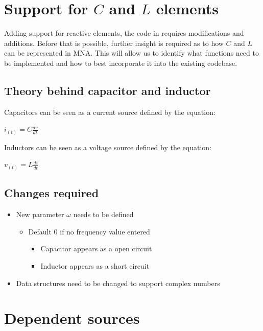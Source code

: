 \documentclass[a4paper, titlepage]{article}
\begin{document}
    \section{Support for $C$ and $L$ elements}
    Adding support for reactive elements, the code in requires modifications and additions. Before that is possible, 
    further insight is required as to how $C$ and $L$ can be represented in MNA. This will allow us to identify what functions 
    need to be implemented and how to best incorporate it into the existing codebase.\par
    \subsection{Theory behind capacitor and inductor}
    Capacitors can be seen as a current source defined by the equation:
    \begin{center}
        $i_{(t)} = C\frac{dv}{dt}$ \par
    \end{center}
    Inductors can be seen as a voltage source defined by the equation:
    \begin{center}
        $v_{(t)} = L\frac{di}{dt}$ \par
    \end{center}
    \subsection{Changes required}
    \begin{itemize}
        \item New parameter $\omega$ needs to be defined
        \begin{itemize}
            \item Default 0 if no frequency value entered
            \begin{itemize}
                \item Capacitor appears as a open circuit
                \item Inductor appears as a short circuit
            \end{itemize}
        \end{itemize}
        \item Data structures need to be changed to support complex numbers
    \end{itemize}


   
    \pagebreak

    \section{Dependent sources}
\end{document}
